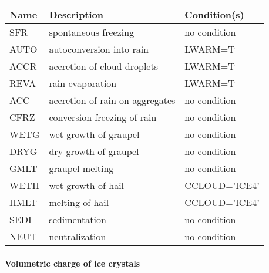 \begin{longtable} {|p{}|p{}|p{}|}
\hline
Name & Description & Condition(s) \\
\hline \hline
\endhead
SFR    & spontaneous freezing            & no condition \\\hline
AUTO   & autoconversion into rain        & LWARM=T \\\hline
ACCR   & accretion of cloud droplets     & LWARM=T \\\hline
REVA   & rain evaporation                & LWARM=T \\\hline
ACC    & accretion of rain on aggregates & no condition \\\hline
CFRZ   & conversion freezing of rain     & no condition \\\hline
WETG   & wet growth of graupel           & no condition \\\hline
DRYG   & dry growth of graupel           & no condition \\\hline
GMLT   & graupel melting                 & no condition \\\hline
WETH   & wet growth of hail              & CCLOUD='ICE4' \\\hline
HMLT   & melting of hail                 & CCLOUD='ICE4' \\\hline
SEDI   & sedimentation                   & no condition \\\hline
NEUT   & neutralization                  & no condition \\\hline
\end{longtable}

\paragraph{Volumetric charge of ice crystals}
\mbox{} %

